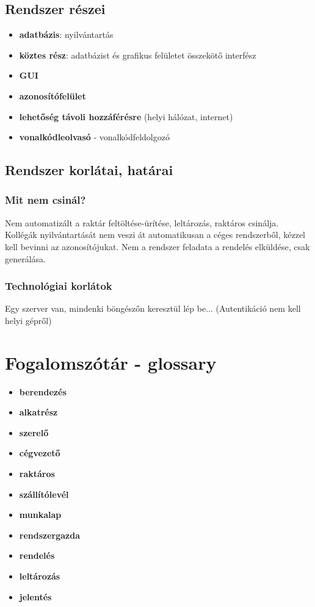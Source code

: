 \documentclass[11pt]{article}\usepackage[left=20mm,right=20mm,top=15mm,bottom=20mm]{geometry}
\begin{document}
\subsection{Rendszer részei}
\begin{itemize}
\item[] \textbf{adatbázis}: nyilvántartás
\item[] \textbf{köztes rész}: adatbázist és grafikus felületet összekötő interfész
\item[] \textbf{GUI}
\item[] \textbf{azonosítófelület}
\item[] \textbf{lehetőség távoli hozzáférésre} (helyi hálózat, internet)
\item[] \textbf{vonalkódleolvasó} - vonalkódfeldolgozó
\end{itemize}

\subsection{Rendszer korlátai, határai}
\subsubsection{Mit nem csinál?}
Nem automatizált a raktár feltöltése-ürítése, leltározás, raktáros csinálja.
Kollégák nyilvántartását nem veszi át automatikusan a céges rendszerből, kézzel kell bevinni az azonosítójukat.
Nem a rendszer feladata a rendelés elküldése, csak generálása.

\subsubsection{Technológiai korlátok}
Egy szerver van, mindenki böngészőn keresztül lép be...
(Autentikáció nem kell helyi gépről)


\section{Fogalomszótár - glossary}
\begin{itemize}
\item[]\textbf{berendezés}
\item[]\textbf{alkatrész}
\item[]\textbf{szerelő}
\item[]\textbf{cégvezető}
\item[]\textbf{raktáros}
\item[]\textbf{szállítólevél}
\item[]\textbf{munkalap}
\item[]\textbf{rendszergazda}
\item[]\textbf{rendelés}
\item[]\textbf{leltározás}
\item[]\textbf{jelentés}
\end{itemize}
\end{document}
